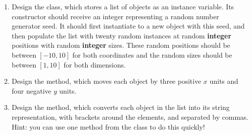 \begin{enumerate}[label=(\alph*)]
    \item Design the  class, which stores a list of objects  as an instance variable. Its constructor should receive an integer representing a random number generator seed. It should first instantiate  to a new  object with this seed, and then populate the list with twenty random  instances at random \textbf{integer} positions with random \textbf{integer} sizes. These random positions should be between $[-10, 10]$ for both coordinates and the random sizes should be between $[1, 10]$ for both dimensions.

    \item Design the  method, which moves each object by three positive $x$ units and four negative $y$ units.

    \item Design the  method, which converts each object in the list into its string representation, with brackets around the elements, and separated by commas. Hint: you can use one method from the  class to do this quickly!
\end{enumerate}

